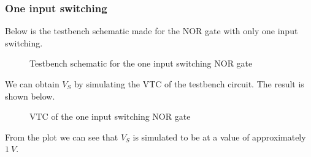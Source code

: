 \documentclass[12pt]{article}
\begin{document}
\subsubsection{One input switching}
Below is the testbench schematic made for the NOR gate with only one input switching.
\begin{figure} [H]
    \centering
    \caption{Testbench schematic for the one input switching NOR gate}
\end{figure}
We can obtain $V_S$ by simulating the VTC of the testbench circuit. The result is shown below.
\begin{figure} [H]
    \centering
    \caption{VTC of the one input switching NOR gate}
\end{figure}
From the plot we can see that $V_S$ is simulated to be at a value of approximately $\SI{1}{V}$.
\end{document}
